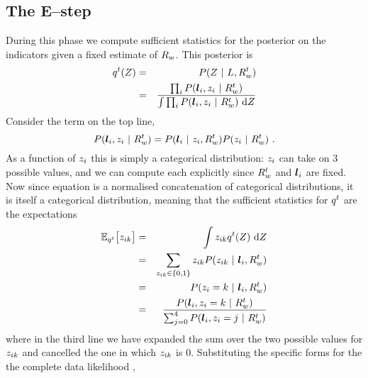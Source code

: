\subsection{The E--step}

During this phase we compute sufficient statistics for the posterior on
the indicators given a fixed estimate of $\SceneR$. This posterior
is
\begin{eqnarray}
  \PosteriorEst^t(\Indicators) &=&
  P(\Indicators ~|~ \LineSegs,\SceneR^t) \\
  \label{eq:posterior-est}
  &=&
  \frac{
    \prod_i P(\LineSeg_i,\Indicator_i ~|~\SceneR^t)
  }{
    \int \prod_i P(\LineSeg_i,\Indicator_i ~|~ \SceneR^t)
    ~\intd\Indicators
  }
\end{eqnarray}
Consider the term on the top line,
\begin{equation}
  P(\LineSeg_i,\Indicator_i ~|~\SceneR^t)
  =
  P(\LineSeg_i ~|~ \Indicator_i,\SceneR^t)
  P(\Indicator_i ~|~ \SceneR^t) ~.
\end{equation}
As a function of $\Indicator_i$ this is simply a categorical
distribution: $\Indicator_i$ can take on 3 possible values, and we can
compute each explicitly since $\SceneR^t$ and $\LineSeg_i$ are
fixed. Now since equation  is a
normalised concatenation of categorical distributions, it is
itself a categorical distribution, meaning that the sufficient
statistics for $\PosteriorEst^t$ are the
expectations
\begin{eqnarray}
  \Expected_{\PosteriorEst^t}\bigl[ \Indicator_{ik} \bigr]
  &=& 
  \int \Indicator_{ik} \PosteriorEst^t(\Indicators) ~\intd\Indicators \\
  &=& 
  \sum_{\Indicator_{ik}\in\{0,1\}}
  \Indicator_{ik} P(\Indicator_{ik} ~|~ \LineSeg_i, \SceneR^t)\\
  &=&
  P(\Indicator_i=k ~|~ \LineSeg_i, \SceneR^t)\\
  &=&
  \label{eq:expected-zik}
  \frac
      {P( \LineSeg_i, \Indicator_i=k ~|~ \SceneR^t)}
      {\sum_{j=0}^4 P(\LineSeg_i, \Indicator_i=j ~|~ \SceneR^t)}
\end{eqnarray}
where in the third line we have expanded the sum over the two possible
values for $\Indicator_{ik}$ and cancelled the one in which
$\Indicator_{ik}$ is 0. Substituting the specific forms for the the
complete data likelihood ,
